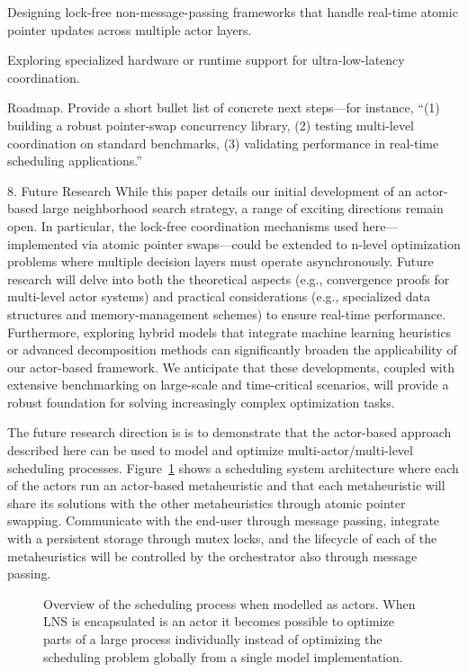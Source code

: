 Designing lock-free non-message-passing frameworks that handle
real-time atomic pointer updates across multiple actor layers. 

Exploring specialized hardware or runtime support for ultra-low-latency
coordination.

Roadmap. Provide a short bullet list of concrete next steps—for instance, “(1)
building a robust pointer-swap concurrency library, (2) testing multi-level
coordination on standard benchmarks, (3) validating performance in real-time
scheduling applications.”

8. Future Research
While this paper details our initial development of an actor-based large
neighborhood search strategy, a range of exciting directions remain open. In
particular, the lock-free coordination mechanisms used here—implemented via
atomic pointer swaps—could be extended to n-level optimization problems where
multiple decision layers must operate asynchronously. Future research will delve
into both the theoretical aspects (e.g., convergence proofs for multi-level
actor systems) and practical considerations (e.g., specialized data structures
and memory-management schemes) to ensure real-time performance. Furthermore,
exploring hybrid models that integrate machine learning heuristics or advanced
decomposition methods can significantly broaden the applicability of our
actor-based framework. We anticipate that these developments, coupled with
extensive benchmarking on large-scale and time-critical scenarios, will provide
a robust foundation for solving increasingly complex optimization tasks.

\label{sec:discussion:future_research}
The future research direction is is to demonstrate that
the actor-based approach described here can be used to model and optimize 
multi-actor/multi-level scheduling processes. 
Figure~\ref{fig:ordinator-architecture}
shows a scheduling system architecture where each of the actors run an actor-based metaheuristic
and that each metaheuristic will share its solutions with the other
metaheuristics through atomic pointer swapping. Communicate with the end-user
through message passing, integrate with a persistent storage through mutex
locks, and the lifecycle of each of the metaheuristics will be controlled by
the orchestrator also through message passing. 

\begin{figure}[H]
	\centering
	
	\caption{
		Overview of the scheduling process when modelled as actors. When LNS is encapsulated 
		is an actor it becomes possible to optimize parts of a large process individually instead of 
		optimizing the scheduling problem globally from a single model implementation.
	}
	\label{fig:ordinator-architecture}
\end{figure}

